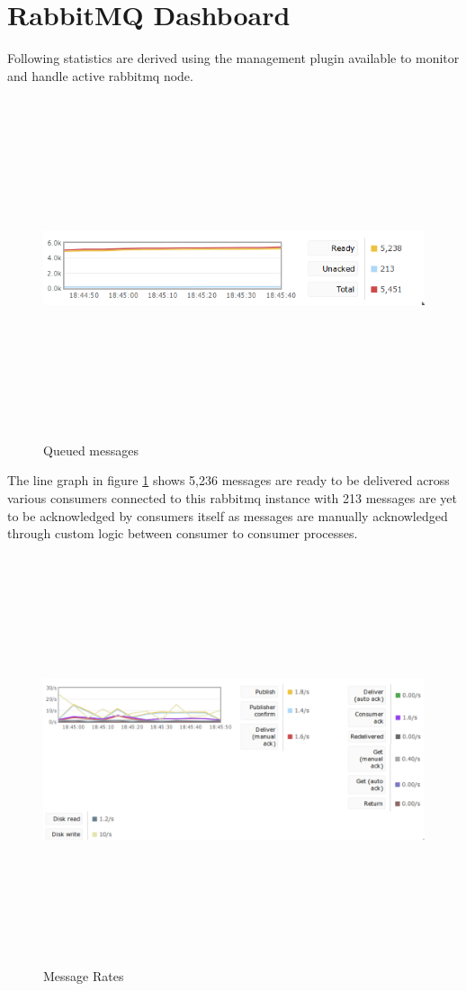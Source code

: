\section{RabbitMQ Dashboard}
Following statistics are derived using the management plugin available to monitor and handle active
rabbitmq node. 

\begin{figure}[h!]
  \centering
  \includegraphics[width=16cm,height=10cm,keepaspectratio]{../media/crawler/rmq_queued_messages.png}
  \caption{Queued messages}
  \label{fig:qmsg}
\end{figure}

\noindent
The line graph in figure \ref{fig:qmsg} shows 5,236 messages are ready to be delivered across various
consumers connected to this rabbitmq instance with 213 messages are yet to be acknowledged by consumers
itself as messages are manually acknowledged through custom logic between consumer to consumer processes.

\begin{figure}[h!]
  \centering
  \includegraphics[width=16cm,height=12cm,keepaspectratio]{../media/crawler/rmq_msg_rates.png}
  \caption{Message Rates}
  \label{fig:msgrates}
\end{figure}

